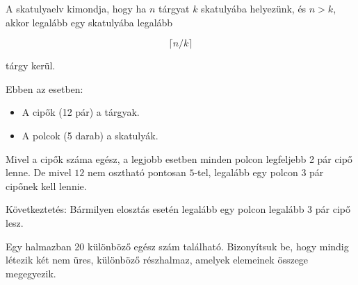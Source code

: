 \begin{solution}
	A skatulyaelv kimondja, hogy ha $n$ tárgyat $k$ skatulyába helyezünk,
	és $n>k$, akkor legalább egy skatulyába legalább
	
	\[
	\lceil n/k\rceil
	\]
	
	tárgy kerül.
	
	Ebben az esetben: 
	\begin{itemize}
		\item A cipők (12 pár) a tárgyak. 
		\item A polcok (5 darab) a skatulyák. 
	\end{itemize}
	Mivel a cipők száma egész, a legjobb esetben minden polcon legfeljebb
	2 pár cipő lenne. De mivel $12$ nem osztható pontosan $5$-tel, legalább
	egy polcon 3 pár cipőnek kell lennie.
	
	Következtetés: Bármilyen elosztás esetén legalább egy polcon legalább
	3 pár cipő lesz. 
\end{solution}
\begin{extraproblem}
	Egy halmazban 20 különböző egész szám található. Bizonyítsuk be,
	hogy mindig létezik két nem üres, különböző részhalmaz, amelyek elemeinek
	összege megegyezik. 
\end{extraproblem}

